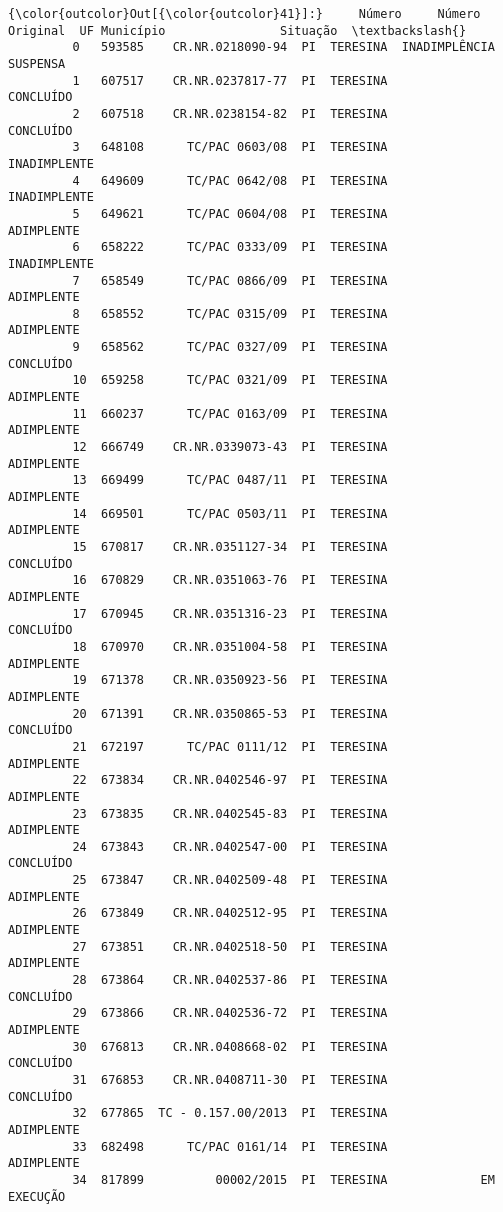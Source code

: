 \documentclass[11pt]{article}
\begin{document}
\begin{Verbatim}[commandchars=\\\{\}]
{\color{outcolor}Out[{\color{outcolor}41}]:}     Número     Número Original  UF Município                Situação  \textbackslash{}
         0   593585    CR.NR.0218090-94  PI  TERESINA  INADIMPLÊNCIA SUSPENSA   
         1   607517    CR.NR.0237817-77  PI  TERESINA               CONCLUÍDO   
         2   607518    CR.NR.0238154-82  PI  TERESINA               CONCLUÍDO   
         3   648108      TC/PAC 0603/08  PI  TERESINA            INADIMPLENTE   
         4   649609      TC/PAC 0642/08  PI  TERESINA            INADIMPLENTE   
         5   649621      TC/PAC 0604/08  PI  TERESINA              ADIMPLENTE   
         6   658222      TC/PAC 0333/09  PI  TERESINA            INADIMPLENTE   
         7   658549      TC/PAC 0866/09  PI  TERESINA              ADIMPLENTE   
         8   658552      TC/PAC 0315/09  PI  TERESINA              ADIMPLENTE   
         9   658562      TC/PAC 0327/09  PI  TERESINA               CONCLUÍDO   
         10  659258      TC/PAC 0321/09  PI  TERESINA              ADIMPLENTE   
         11  660237      TC/PAC 0163/09  PI  TERESINA              ADIMPLENTE   
         12  666749    CR.NR.0339073-43  PI  TERESINA              ADIMPLENTE   
         13  669499      TC/PAC 0487/11  PI  TERESINA              ADIMPLENTE   
         14  669501      TC/PAC 0503/11  PI  TERESINA              ADIMPLENTE   
         15  670817    CR.NR.0351127-34  PI  TERESINA               CONCLUÍDO   
         16  670829    CR.NR.0351063-76  PI  TERESINA              ADIMPLENTE   
         17  670945    CR.NR.0351316-23  PI  TERESINA               CONCLUÍDO   
         18  670970    CR.NR.0351004-58  PI  TERESINA              ADIMPLENTE   
         19  671378    CR.NR.0350923-56  PI  TERESINA              ADIMPLENTE   
         20  671391    CR.NR.0350865-53  PI  TERESINA               CONCLUÍDO   
         21  672197      TC/PAC 0111/12  PI  TERESINA              ADIMPLENTE   
         22  673834    CR.NR.0402546-97  PI  TERESINA              ADIMPLENTE   
         23  673835    CR.NR.0402545-83  PI  TERESINA              ADIMPLENTE   
         24  673843    CR.NR.0402547-00  PI  TERESINA               CONCLUÍDO   
         25  673847    CR.NR.0402509-48  PI  TERESINA              ADIMPLENTE   
         26  673849    CR.NR.0402512-95  PI  TERESINA              ADIMPLENTE   
         27  673851    CR.NR.0402518-50  PI  TERESINA              ADIMPLENTE   
         28  673864    CR.NR.0402537-86  PI  TERESINA               CONCLUÍDO   
         29  673866    CR.NR.0402536-72  PI  TERESINA              ADIMPLENTE   
         30  676813    CR.NR.0408668-02  PI  TERESINA               CONCLUÍDO   
         31  676853    CR.NR.0408711-30  PI  TERESINA               CONCLUÍDO   
         32  677865  TC - 0.157.00/2013  PI  TERESINA              ADIMPLENTE   
         33  682498      TC/PAC 0161/14  PI  TERESINA              ADIMPLENTE   
         34  817899          00002/2015  PI  TERESINA             EM EXECUÇÃO   
         

\end{Verbatim}
\end{document}
